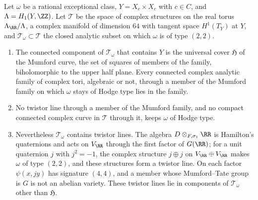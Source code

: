 \begin{proposition}\label{prop:notwistor}
Let $\omega$ be a rational exceptional class, $Y=X_{c}\times X_{c}$ with
$c\in C$, and $\Lambda=H_{1}(Y,\ZZ)$. Let $\mathcal{T}$ be the space of
complex structures on the real torus $\Lambda_{\RR}/\Lambda$, a complex
manifold of dimension $64$ with tangent space $H^{1}(T_{Y})$ at $Y$, and
$\mathcal{T}_{\omega}\subset\mathcal{T}$ the closed analytic subset on which
$\omega$ is of type $(2,2)$.
\begin{enumerate}[label=\textup{(\roman*)},leftmargin=2.6em,itemsep=2pt]
\item The connected component of $\mathcal{T}_{\omega}$ that contains $Y$ is
  the universal cover $\mathfrak{H}$ of the Mumford curve, the set of
  squares of members of the family, biholomorphic to the upper half plane.
  Every connected complex analytic family of complex tori, algebraic or not,
  through a member of the Mumford family on which $\omega$ stays of Hodge
  type lies in the family.
\item No twistor line through a member of the Mumford family, and no compact
  connected complex curve in $\mathcal{T}$ through it, keeps $\omega$ of
  Hodge type.
\item Nevertheless $\mathcal{T}_{\omega}$ contains twistor lines. The algebra
  $D\otimes_{F,\sigma_{1}}\RR$ is Hamilton's quaternions and acts on
  $V_{\RR}$ through the first factor of $G(\RR)$; for a unit quaternion $j$
  with $j^{2}=-1$, the complex structure $j\oplus j$ on $V_{\RR}\oplus
  V_{\RR}$ makes $\omega$ of type $(2,2)$, and these structures form a twistor
  line. On each factor $\psi(x,jy)$ has signature $(4,4)$, and a member whose
  Mumford--Tate group is $G$ is not an abelian variety. These twistor lines
  lie in components of $\mathcal{T}_{\omega}$ other than $\mathfrak{H}$.
\end{enumerate}
\end{proposition}

